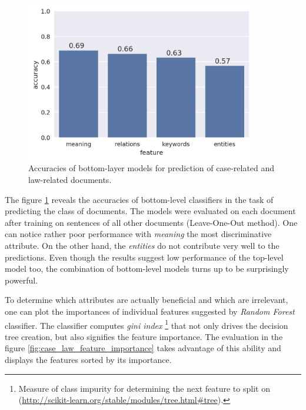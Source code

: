 \documentclass[
  digital, %
  notable,   %
  nolof,     %
  nolot,     %
]{fithesis3}
\begin{document}
\begin{figure}[h]
\caption{Accuracies of bottom-layer models for prediction of case-related and law-related documents.}
\label{fig:Case-Law_accuracies}
\includegraphics[width=0.9\textwidth]{img/Case-Law_accuracies}
\end{figure}

The figure \ref{fig:Case-Law_accuracies} reveals the accuracies of bottom-level classifiers in the task of predicting the class of documents.
The models were evaluated on each document after training on sentences of all other documents (Leave-One-Out method).
One can notice rather poor performance with \textit{meaning} the most discriminative attribute.
On the other hand, the \textit{entities} do not contribute very well to the predictions.
Even though the results suggest low performance of the top-level model too, the combination of bottom-level models turns up to be surprisingly powerful.

To determine which attributes are actually beneficial and which are irrelevant, one can plot the importances of individual features suggested by \textit{Random Forest} classifier.
The classifier computes \textit{gini index} \footnote{Measure of class impurity for determining the next feature to split on \\(\url{http://scikit-learn.org/stable/modules/tree.html\#tree}).} that not only drives the decision tree creation, but also signifies the feature importance.
The evaluation in the figure \ref{fig:case_law_feature_importance} takes advantage of this ability and displays the features sorted by its importance.
\end{document}
